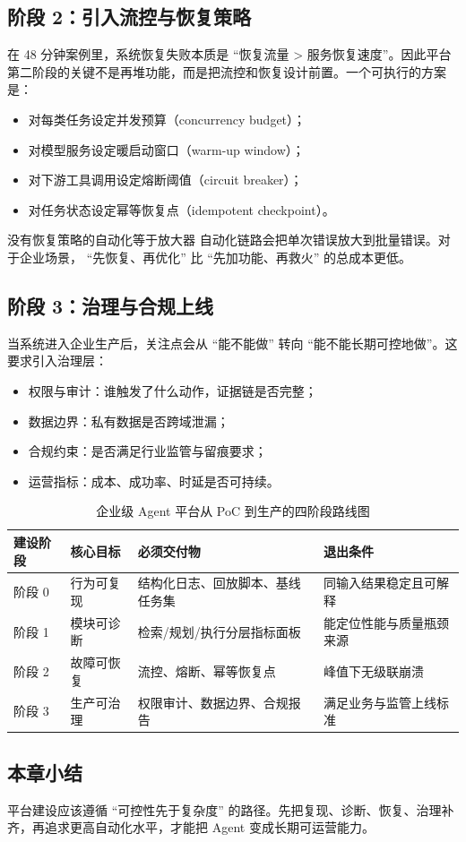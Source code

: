 \subsection{阶段 2：引入流控与恢复策略}
在 48 分钟案例里，系统恢复失败本质是 ``恢复流量 > 服务恢复速度''。因此平台第二阶段的关键不是再堆功能，而是把流控和恢复设计前置。一个可执行的方案是：
\begin{itemize}
    \item 对每类任务设定并发预算（concurrency budget）；
    \item 对模型服务设定暖启动窗口（warm-up window）；
    \item 对下游工具调用设定熔断阈值（circuit breaker）；
    \item 对任务状态设定幂等恢复点（idempotent checkpoint）。
\end{itemize}

\begin{warningbox}{没有恢复策略的自动化等于放大器}
自动化链路会把单次错误放大到批量错误。对于企业场景， ``先恢复、再优化'' 比 ``先加功能、再救火'' 的总成本更低。
\end{warningbox}

\subsection{阶段 3：治理与合规上线}
当系统进入企业生产后，关注点会从 ``能不能做'' 转向 ``能不能长期可控地做''。这要求引入治理层：
\begin{itemize}
    \item 权限与审计：谁触发了什么动作，证据链是否完整；
    \item 数据边界：私有数据是否跨域泄漏；
    \item 合规约束：是否满足行业监管与留痕要求；
    \item 运营指标：成本、成功率、时延是否可持续。
\end{itemize}

\begin{table}[H]
\centering
\begin{tabular}{p{2.4cm}p{3.5cm}p{3.6cm}p{3.6cm}}
\toprule
\textbf{建设阶段} & \textbf{核心目标} & \textbf{必须交付物} & \textbf{退出条件} \\
\midrule
阶段 0 & 行为可复现 & 结构化日志、回放脚本、基线任务集 & 同输入结果稳定且可解释 \\
阶段 1 & 模块可诊断 & 检索/规划/执行分层指标面板 & 能定位性能与质量瓶颈来源 \\
阶段 2 & 故障可恢复 & 流控、熔断、幂等恢复点 & 峰值下无级联崩溃 \\
阶段 3 & 生产可治理 & 权限审计、数据边界、合规报告 & 满足业务与监管上线标准 \\
\bottomrule
\end{tabular}
\caption{企业级 Agent 平台从 PoC 到生产的四阶段路线图}
\end{table}

\subsection{本章小结}
平台建设应该遵循 ``可控性先于复杂度'' 的路径。先把复现、诊断、恢复、治理补齐，再追求更高自动化水平，才能把 Agent 变成长期可运营能力。

